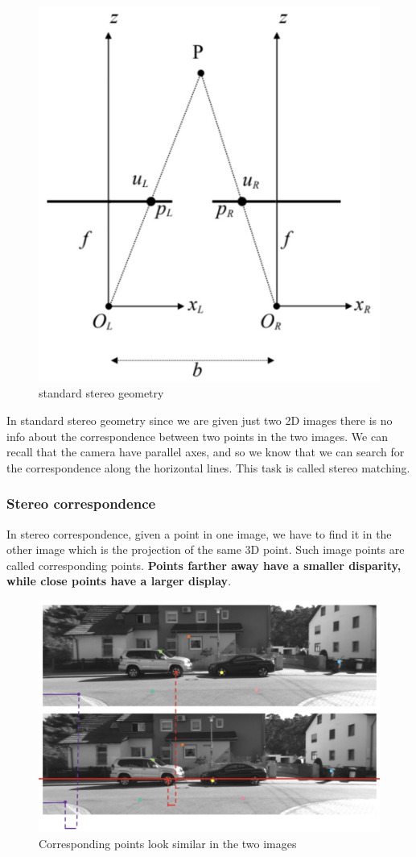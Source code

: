 \begin{figure}[htbp]
  \centering
  \includegraphics[width=0.45\linewidth]{./img/standard_stereo_geometry.jpg}
  \caption{standard stereo geometry}
  \label{fig:standard_stereo_geometry}
\end{figure}


In standard stereo geometry since we are given just two 2D images there is no info about the correspondence between two points in the two images.
We can recall that the camera have parallel axes, and so we know that we can search for the correspondence along the horizontal lines.
This task is called stereo matching.

\subsubsection{Stereo correspondence}
In stereo correspondence, given a point in one image, we have to find it in the other image which is the projection of the same 3D point.
Such image points are called corresponding points.
\textbf{Points farther away have a smaller disparity, while close points have a larger display}.

\begin{figure}[htbp]
  \centering
  \includegraphics[width=0.65\linewidth]{./img/stereo_correspondence.jpg}
  \caption{Corresponding points look similar in the two images}
  \label{fig:stereo_correspondence}
\end{figure}

